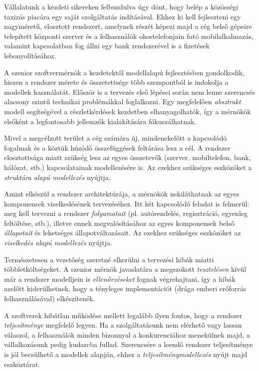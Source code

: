 \begin{pelda}
	Vállalatunk a kezdeti sikereken felbuzdulva úgy dönt, hogy belép a közösségi taxizás piacára egy saját szolgáltatás indításával. Ehhez ki kell fejleszteni egy nagyméretű, elosztott rendszert, amelynek részét képezi majd a cég belső gépeire telepített központi szerver és a felhasználók okostelefonjain futó mobilalkalmazás, valamint kapcsolatban fog állni egy bank rendszerével is a fizetések lebonyolításához.
	
	A szenior szoftvermérnök a kezdetektől modellalapú fejlesztésben gondolkodik, hiszen a rendszer mérete és összetettsége több szempontból is indokolja a modellek használatát. Először is a tervezés első lépései során nem lenne szerencsés alacsony szintű technikai problémákkal foglalkozni. Egy megfelelően \emph{absztrakt} modell segítségével a részletkérdések kezdetben elhanyagolhatók, így a mérnökök elsőként a legfontosabb jellemzők kialakítására fókuszálhatnak.
	
	Mivel a megcélzott terület a cég számára új, mindenekelőtt a kapcsolódó fogalmak és a köztük húzódó összefüggések feltárása lesz a cél. A rendszer elosztottsága miatt szükség lesz az egyes összetevők (szerver, mobiltelefon, bank, hálózat, stb.) kapcsolatainak modellezésére is. Az ezekhez szükséges eszközöket a \emph{struktúra alapú modellezés} nyújtja.
	
	Amint elkészül a rendszer architektúrája, a mérnökök nekiláthatnak az egyes komponensek viselkedésének tervezéséhez. Itt két kapcsolódó feladat is felmerül: meg kell tervezni a rendszer \emph{folyamatait} (pl. autórendelés, regisztráció, egyenleg feltöltése, stb.), illetve ennek megvalósításához az egyes komponensek belső \emph{állapotait} és lehetséges állapotváltozásait. Az ezekhez szükséges eszközöket az \emph{viselkedés alapú modellezés} nyújtja.
	
	Természetesen a vezetőség szeretné elkerülni a tervezési hibák miatti többletköltségeket. A szenior mérnök javaslatára a megszokott \emph{tesztelésen} kívül már a rendszer modelljein is \emph{ellenőrzéseket} fognak végrehajtani, így a hibák azelőtt kiderülhetnek, hogy a tényleges implementációt (drága emberi erőforrás felhasználásával) elkészítenék.
	
	A szoftverek hibátlan működése mellett legalább ilyen fontos, hogy a rendszer \emph{teljesítménye} megfelelő legyen. Ha a szolgáltatásunk nem elérhető vagy lassan válaszol, a felhasználók minden bizonnyal a konkurenciához menekülnek majd, a vállalkozásunk pedig kudarcba fullad. Szerencsére a leendő rendszer teljesítménye is jól becsülhető a modellek alapján, ehhez a \emph{teljesítménymodellezés} nyújt majd eszköztárat.
	

\end{pelda}
